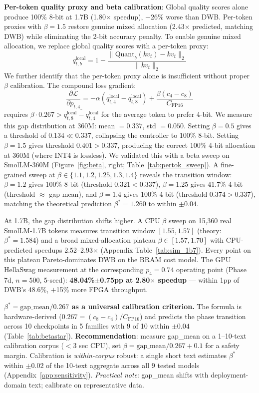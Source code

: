\documentclass{article}
\begin{document}
\textbf{Per-token quality proxy and beta calibration}: Global quality scores alone produce 100\% 8-bit at 1.7B (1.80$\times$ speedup), $-26\%$ worse than DWB. Per-token proxies with $\beta=1.5$ restore genuine mixed allocation (2.43$\times$ predicted, matching DWB) while eliminating the 2-bit accuracy penalty. To enable genuine mixed allocation, we replace global quality scores with a per-token proxy:
\[
q_{t,b}^\text{local} = 1 - \frac{\|\text{Quant}_b(kv_t) - kv_t\|_2}{\|kv_t\|_2}
\]
We further identify that the per-token proxy alone is insufficient without proper $\beta$ calibration. The compound loss gradient:
\[
\frac{\partial \mathcal{L}}{\partial p_{t,4}} = -\alpha(q_{t,4}^\text{local} - q_{t,8}^\text{local}) + \frac{\beta(c_4 - c_8)}{C_\text{FP16}}
\]
requires $\beta \cdot 0.267 > \overline{q_{t,8}^\text{local} - q_{t,4}^\text{local}}$ for the average token to prefer 4-bit. We measure this gap distribution at 360M: mean $= 0.337$, std $= 0.050$. Setting $\beta = 0.5$ gives a threshold of $0.134 \ll 0.337$, collapsing the controller to 100\% 8-bit. Setting $\beta = 1.5$ gives threshold $0.401 > 0.337$, producing the correct 100\% 4-bit allocation at 360M (where INT4 is lossless). We validated this with a beta sweep on SmolLM-360M (Figure~\ref{fig:beta}, right; Table~\ref{tab:pertok_sweep}). A fine-grained sweep at $\beta \in \{1.1, 1.2, 1.25, 1.3, 1.4\}$ reveals the transition window: $\beta=1.2$ gives 100\% 8-bit (threshold $0.321 < 0.337$), $\beta=1.25$ gives 41.7\% 4-bit (threshold $\approx$ gap mean), and $\beta=1.4$ gives 100\% 4-bit (threshold $0.374 > 0.337$), matching the theoretical prediction $\beta^* = 1.260$ to within $\pm 0.04$.

At 1.7B, the gap distribution shifts higher. A CPU $\beta$ sweep on 15,360 real SmolLM-1.7B tokens measures transition window $[1.55, 1.57]$ (theory: $\beta^*{=}1.584$) and a broad mixed-allocation plateau $\beta\in[1.57, 1.70]$ with CPU-predicted speedups 2.52--2.93$\times$ (Appendix Table~\ref{tab:sim_1b7}). Every point on this plateau Pareto-dominates DWB on the BRAM cost model. The GPU HellaSwag measurement at the corresponding $p_4{=}0.74$ operating point (Phase 7d, $n{=}500$, 5-seed): \textbf{48.04\%$\pm$0.75pp at 2.80$\times$ speedup} --- within 1pp of DWB's 48.6\%, $+$15\% more FPGA throughput.

\textbf{$\beta^* = \text{gap\_mean}/0.267$ as a universal calibration criterion.} The formula is hardware-derived ($0.267 = (c_8{-}c_4)/C_\text{FP16}$) and predicts the phase transition across 10 checkpoints in 5 families with 9 of 10 within $\pm 0.04$ (Table~\ref{tab:betastar}). \textbf{Recommendation}: measure gap\_mean on a 1--10-text calibration corpus ($<$3 sec CPU), set $\beta = \text{gap\_mean}/0.267 + 0.1$ for a safety margin. Calibration is \emph{within-corpus} robust: a single short text estimates $\beta^*$ within $\pm 0.02$ of the 10-text aggregate across all 9 tested models (Appendix~\ref{app:sensitivity}). \emph{Practical note}: gap\_mean shifts with deployment-domain text; calibrate on representative data.
\end{document}
